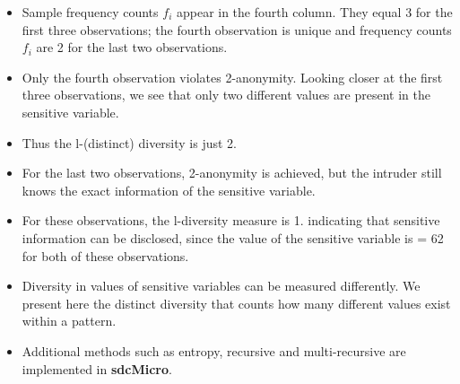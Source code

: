 \documentclass{beamer}
\begin{document}
		\begin{frame}	
		\begin{itemize}
		\item Sample frequency counts $f_i$ appear in the fourth column. They equal 3 for the ﬁrst three observations; the
		fourth observation is unique and frequency counts $f_i$ are 2 for the last two observations. 
		\item Only the fourth observation violates 2-anonymity. Looking closer at the ﬁrst
		three observations, we see that only two different values are present in the sensitive
		variable. 
		\item Thus the l-(distinct) diversity is just 2. 
		\end{itemize}
	\end{frame}
	\begin{frame}
		\begin{itemize}
		\item For the last two observations,
		2-anonymity is achieved, but the intruder still knows the exact information of the
		sensitive variable. \item For these observations, the l-diversity measure is 1. indicating
		that sensitive information can be disclosed, since the value of the sensitive variable
		is = 62 for both of these observations.
		\end{itemize}
		\end{frame}
		\begin{frame}
		\begin{itemize}
		\item Diversity in values of sensitive variables can be measured differently. We present
		here the distinct diversity that counts how many different values exist within a
		pattern. 
		\item Additional methods such as entropy, recursive and multi-recursive are implemented in \textbf{sdcMicro}.
		\end{itemize}
	\end{frame}
\end{document}
